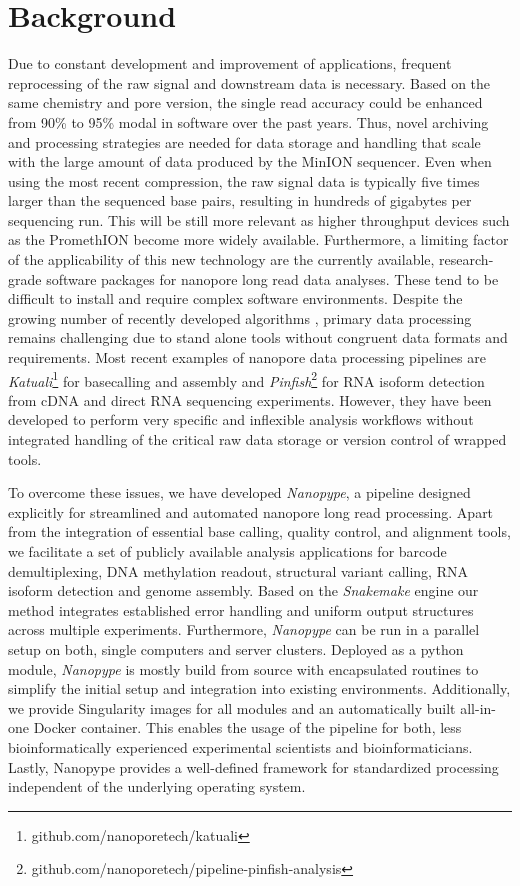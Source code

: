 \section{Background}
\label{sec:nanopype:background}

Due to constant development and improvement of applications, frequent reprocessing of the raw signal and downstream data is necessary. Based on the same chemistry and pore version, the single read accuracy could be enhanced from 90\% to 95\% modal in software over the past years. Thus, novel archiving and processing strategies are needed for data storage and handling that scale with the large amount of data produced by the MinION sequencer. Even when using the most recent compression, the raw signal data is typically five times larger than the sequenced base pairs, resulting in hundreds of gigabytes per sequencing run. This will be still more relevant as higher throughput devices such as the PromethION become more widely available. Furthermore, a limiting factor of the applicability of this new technology are the currently available, research-grade software packages for nanopore long read data analyses. These tend to be difficult to install and require complex software environments. Despite the growing number of recently developed algorithms \cite{Magi2018}, primary data processing remains challenging due to stand alone tools without congruent data formats and requirements. 
Most recent examples of nanopore data processing pipelines are \textit{Katuali}\footnote{github.com/nanoporetech/katuali} for basecalling and assembly and \textit{Pinfish}\footnote{github.com/nanoporetech/pipeline-pinfish-analysis} for RNA isoform detection from cDNA and direct RNA sequencing experiments. However, they have been developed to perform very specific and inflexible analysis workflows without integrated handling of the critical raw data storage or version control of wrapped tools.

To overcome these issues, we have developed \textit{Nanopype}, a pipeline designed explicitly for streamlined and automated nanopore long read processing. Apart from the integration of essential base calling, quality control, and alignment tools, we facilitate a set of publicly available analysis applications for barcode demultiplexing, DNA methylation readout, structural variant calling, RNA isoform detection and genome assembly. 
Based on the \textit{Snakemake} engine \cite{Koester2012} our method integrates established error handling and uniform output structures across multiple experiments. Furthermore, \textit{Nanopype} can be run in a parallel setup on both, single computers and server clusters. Deployed as a python module, \textit{Nanopype} is mostly build from source with encapsulated routines to simplify the initial setup and integration into existing environments. Additionally, we provide Singularity images for all modules and an automatically built all-in-one Docker container. This enables the usage of the pipeline for both, less bioinformatically experienced experimental scientists and bioinformaticians. Lastly, Nanopype provides a well-defined framework for standardized processing independent of the underlying operating system.




